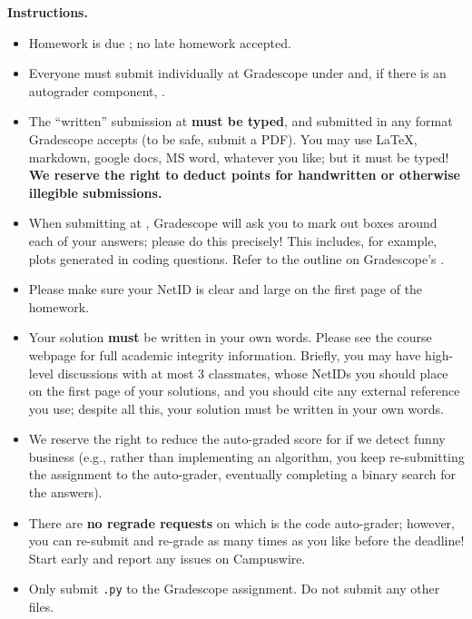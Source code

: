 
\textbf{Instructions.}
\begin{itemize}
\item
   Homework is due \textbf{\duedate}; 
   no late homework accepted.

    \item
    Everyone must submit individually at Gradescope under  \hw{} and, if there is an autograder component, \hwc{}.

    \item
    The ``written'' submission at  \hw{} \textbf{must be typed}, and submitted in
    any format Gradescope accepts (to be safe, submit a PDF).  You may use \LaTeX, markdown,
    google docs, MS word, whatever you like; but it must be typed!
    \textbf{We reserve the right to deduct points for handwritten or otherwise illegible submissions.}

    \item
    When submitting at \hw{}, Gradescope will ask you to mark out boxes
    around each of your answers; please do this precisely! This includes, for example,
    plots generated in coding questions. Refer to the outline on Gradescope's \hw{}.

    \item
    Please make sure your NetID is clear and large on the first page of the homework.

    \item
    Your solution \textbf{must} be written in your own words.
    Please see the course webpage for full academic integrity information.
    Briefly, you may have high-level discussions with at most 3 classmates,
    whose NetIDs you should place on the first page of your solutions,
    and you should cite any external reference you use; despite all this,
    your solution must be written in your own words.

    \item
    We reserve the right to reduce the auto-graded score for \hwc{}
    if we detect funny business (e.g., rather than implementing an algorithm,
    you keep re-submitting the assignment to the auto-grader, eventually completing
    a binary search for the answers).

    \item
    There are \textbf{no regrade requests} on \hwc{} which is the code auto-grader;
    however, you can re-submit and re-grade as many times as you like before the deadline!
    Start early and report any issues on Campuswire.

    \item 
    Only submit \texttt{\hw{}.py} to the Gradescope \texttt{\hwc{}} assignment. 
    Do not submit any other files.


\end{itemize}

